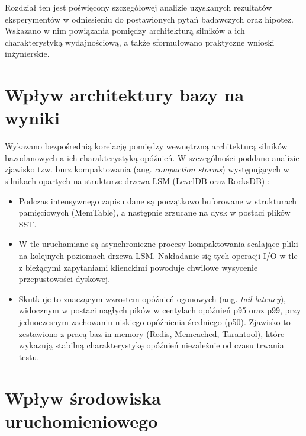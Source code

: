 Rozdział ten jest poświęcony szczegółowej analizie uzyskanych rezultatów eksperymentów w odniesieniu do postawionych pytań badawczych oraz hipotez. Wskazano w nim powiązania pomiędzy architekturą silników a ich charakterystyką wydajnościową, a także sformułowano praktyczne wnioski inżynierskie.

\section{Wpływ architektury bazy na wyniki}
Wykazano bezpośrednią korelację pomiędzy wewnętrzną architekturą silników bazodanowych a ich charakterystyką opóźnień. W szczególności poddano analizie zjawisko tzw. burz kompaktowania (ang. \emph{compaction storms}) występujących w silnikach opartych na strukturze drzewa LSM (LevelDB oraz RocksDB) \cite{oneil1996}:
\begin{itemize}
    \item Podczas intensywnego zapisu dane są początkowo buforowane w strukturach pamięciowych (MemTable), a następnie zrzucane na dysk w postaci plików SST.
    \item W tle uruchamiane są asynchroniczne procesy kompaktowania scalające pliki na kolejnych poziomach drzewa LSM. Nakładanie się tych operacji I/O w tle z bieżącymi zapytaniami klienckimi powoduje chwilowe wysycenie przepustowości dyskowej.
    \item Skutkuje to znaczącym wzrostem opóźnień ogonowych (ang. \emph{tail latency}), widocznym w postaci nagłych pików w centylach opóźnień p95 oraz p99, przy jednoczesnym zachowaniu niskiego opóźnienia średniego (p50). Zjawisko to zestawiono z pracą baz in-memory (Redis, Memcached, Tarantool), które wykazują stabilną charakterystykę opóźnień niezależnie od czasu trwania testu.
\end{itemize}

\section{Wpływ środowiska uruchomieniowego}

